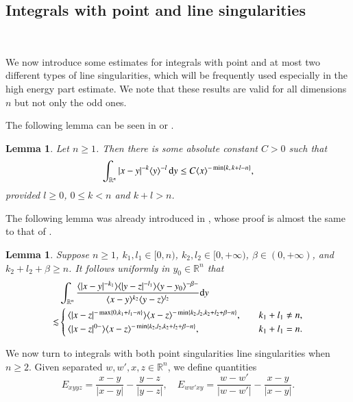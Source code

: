 \documentclass[11pt,reqno]{amsart}
\def\d{{\rm d}}
\newtheorem{lemma}[theorem]{Lemma}
\numberwithin{equation}{section}
\theoremstyle{definition}
\begin{document}
\subsection{Integrals with point and line singularities}\

We now introduce some estimates for integrals with point and at most two different types of line singularities, which will be frequently used especially in the high energy part estimate. We note that these results are valid for all dimensions $n$ but not only the odd ones.

The following lemma can be seen in \cite[Lemma 3.8]{GV} or \cite[Lemma 6.3]{EG10}.
\begin{lemma}\label{lem3.10}
	Let $n\ge 1$. Then there is some absolute constant $C>0$ such that
	\begin{equation*}\label{eq2.20}
		\int_{\mathbb{R}^n}|x-y|^{-k}\langle y\rangle^{-l}\,\d y\leq C\langle x\rangle^{-\min\{k,\, k+l-n\}},
	\end{equation*}
	provided  $l\ge 0$, $0\le k<n$ and $k+l>n$.
\end{lemma}

The following lemma was already introduced in \cite{CHHZ}, whose proof is almost the same to that of \cite[Lemma 6.3]{EG10}.

\begin{lemma}\label{lmEd}
	Suppose $n\geq1$, $k_1,l_1\in[0,n)$, $k_2,l_2\in[0,+\infty)$, $\beta\in(0,+\infty)$, and $k_2+l_2+\beta\geq n$. It follows uniformly in $y_0\in\mathbb{R}^n$ that
	\begin{equation*}
		\begin{split}
			&\int_{\mathbb{R}^n}\frac{\langle|x-y|^{-k_1}\rangle\langle|y-z|^{-l_1}\rangle\langle y-y_0\rangle^{-\beta-}}{\langle x-y\rangle^{k_2}\langle y-z\rangle^{l_2}}\d y\\
			\lesssim&\begin{cases}
				\langle|x-z|^{-\max\{0,k_1+l_1-n\}}\rangle\langle x-z\rangle^{-\min\{k_2,l_2,k_2+l_2+\beta-n\}},\quad&k_1+l_1\neq n,\\
				\langle|x-z|^{0-}\rangle\langle x-z\rangle^{-\min\{k_2,l_2,k_2+l_2+\beta-n\}},&k_1+l_1=n.
			\end{cases}
		\end{split}
	\end{equation*}
\end{lemma}


We now turn to integrals with both point singularities line singularities when $n\geq2$. Given separated $w,w',x,z\in\mathbb{R}^n$, we define quantities
\begin{equation}\label{linesing}
	E_{xyyz}=\mbox{$\frac{x-y}{|x-y|}-\frac{y-z}{|y-z|}$},\quad E_{ww'xy}=\mbox{$\frac{w-w'}{|w-w'|}-\frac{x-y}{|x-y|}$}.
\end{equation}
\end{document}
